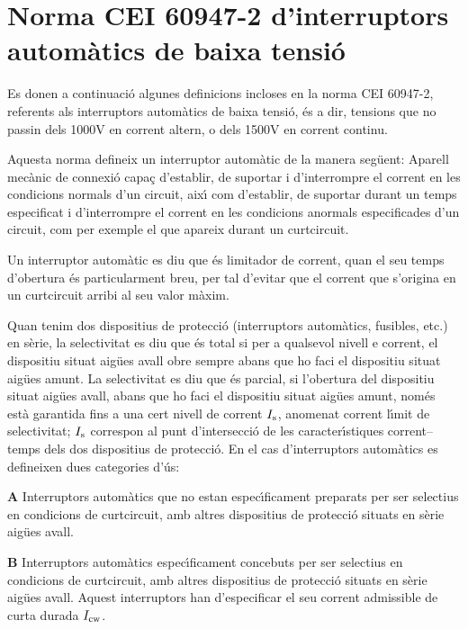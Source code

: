 \section{Norma CEI 60947-2  d'interruptors autom\`{a}tics  de baixa tensi\'{o}}


Es donen a continuaci\'{o} algunes definicions incloses en la norma \textsf{CEI 60947-2}, referents als interruptors autom\`{a}tics de baixa tensi\'{o}, \'{e}s a dir, tensions que no passin dels 1000\unit{V} en corrent altern, o dels 1500\unit{V} en corrent continu.

Aquesta norma defineix un interruptor autom\`{a}tic de la manera seg\"{u}ent: Aparell mec\`{a}nic de connexi\'{o} capa\c{c} d'establir, de suportar i d'interrompre el corrent en les condicions normals d'un circuit, aix\'{\i} com d'establir, de suportar durant un temps especificat i  d'interrompre el corrent en les condicions anormals especificades d'un circuit, com per exemple el que apareix durant un curtcircuit.

Un interruptor autom\`{a}tic es diu que \'{e}s limitador de corrent, quan el seu temps d'obertura \'{e}s particularment breu, per tal d'evitar que el corrent que s'origina en un curtcircuit arribi al seu valor m\`{a}xim.

Quan tenim dos  dispositius de protecci\'{o} (interruptors autom\`{a}tics, fusibles, etc.) en s\`{e}rie, la selectivitat es diu que \'{e}s total si per a qualsevol nivell e corrent, el dispositiu situat aig\"{u}es avall obre sempre abans que ho faci el dispositiu situat aig\"{u}es amunt. La selectivitat es diu que \'{e}s parcial, si l'obertura del dispositiu situat aig\"{u}es avall, abans que ho faci el dispositiu situat aig\"{u}es amunt, nom\'{e}s est\`{a} garantida fins a una cert nivell de corrent $I_\mathrm{s}$, anomenat corrent l\'{\i}mit de selectivitat; $I_\mathrm{s}$ correspon al punt d'intersecci\'{o} de les caracter\'{\i}stiques corrent--temps dels dos dispositius de protecci\'{o}. En el cas d'interruptors autom\`{a}tics es defineixen dues categories d'\'{u}s:
 \begin{list}{}
   {\setlength{\labelwidth}{10mm} \setlength{\leftmargin}{10mm} \setlength{\labelsep}{2mm}}
   \item[\textbf{A}] Interruptors autom\`{a}tics que no estan espec\'{\i}ficament preparats per ser selectius en condicions de curtcircuit, amb altres dispositius de protecci\'{o} situats en s\`{e}rie  aig\"{u}es avall.
   \item[\textbf{B}] Interruptors autom\`{a}tics espec\'{\i}ficament concebuts per ser selectius en condicions de curtcircuit, amb altres dispositius de protecci\'{o} situats en s\`{e}rie  aig\"{u}es avall. Aquest interruptors han d'especificar el seu corrent admissible de curta durada $I_\mathrm{cw}$.
\end{list}

